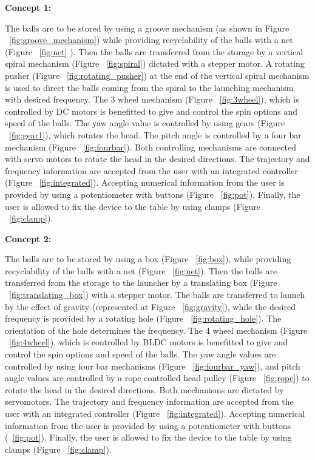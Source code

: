 \documentclass[12pt]{article}
\begin{document}
    
    \textbf{Concept 1:}
    
    The balls are to be stored by using a groove mechanism (as shown in Figure ~\ref{fig:groove_mechanism}) while providing recyclability of the balls with a net (Figure ~\ref{fig:net} ). Then the balls are transferred from the storage by a vertical spiral mechanism (Figure ~\ref{fig:spiral}) dictated with a stepper motor. A rotating pusher (Figure ~\ref{fig:rotating_pusher}) at the end of the vertical spiral mechanism is used to direct the balls coming from the spiral to the launching mechanism with desired frequency. The 3 wheel mechanism (Figure ~\ref{fig:3wheel}), which is controlled by DC motors is benefitted to give and control the spin options and speed of the balls. The yaw angle value is controlled by using gears (Figure ~\ref{fig:gear1}), which rotates the head. The pitch angle is controlled by a four bar mechanism (Figure ~\ref{fig:fourbar}). Both controlling mechanisms are connected with servo motors to rotate the head in the desired directions. The trajectory and frequency information are accepted from the user with an integrated controller (Figure ~\ref{fig:integrated}). Accepting numerical information from the user is provided by using a potentiometer with buttons (Figure ~\ref{fig:pot}). Finally, the user is allowed to fix the device to the table by using clamps (Figure ~\ref{fig:clamp}).

    \textbf{Concept 2:}
    
    The balls are to be stored by using a box (Figure ~\ref{fig:box}), while providing recyclability of the balls with a net (Figure ~\ref{fig:net}). Then the balls are transferred from the storage to the launcher by a translating box (Figure ~\ref{fig:translating_box}) with a stepper motor. The balls are transferred to launch by the effect of gravity (represented at Figure ~\ref{fig:gravity}), while the desired frequency is provided by a rotating hole (Figure ~\ref{fig:rotating_hole}). The orientation of the hole determines the frequency. The 4 wheel mechanism (Figure ~\ref{fig:4wheel}), which is controlled by BLDC motors is benefitted to give and control the spin options and speed of the balls. The yaw angle values are controlled by using four bar mechanisms (Figure ~\ref{fig:fourbar_yaw}), and pitch angle values are controlled by a rope controlled head pulley (Figure ~\ref{fig:rope})  to rotate the head in the desired directions. Both mechanisms are dictated by servomotors. The trajectory and frequency information are accepted from the user with an integrated controller (Figure ~\ref{fig:integrated}). Accepting numerical information from the user is provided by using a potentiometer with buttons (~\ref{fig:pot}). Finally, the user is allowed to fix the device to the table by using clamps (Figure ~\ref{fig:clamp}).
\end{document}
